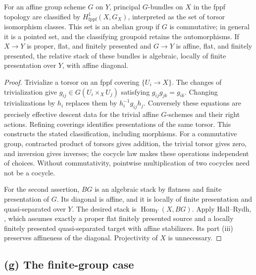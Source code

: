 \begin{theorem}
\label{geo-Kf}
For an affine group scheme $G$ on $Y$, principal $G$-bundles on $X$ in the
fppf topology are classified by $H^1_{\mathrm{fppf}}(X,G_X)$, interpreted
as the set of torsor isomorphism classes. This set is an abelian group if
$G$ is commutative; in general it is a pointed set, and the classifying
groupoid retains the automorphisms.
If $X\to Y$ is proper, flat, and finitely presented and $G\to Y$ is
affine, flat, and finitely presented, the relative stack of these bundles
is algebraic, locally of finite presentation over $Y$, with affine diagonal.
\end{theorem}
\begin{proof}
Trivialize a torsor on an fppf covering $\{U_i\to X\}$. The changes of
trivialization give $g_{ij}\in G(U_i\times_XU_j)$ satisfying
$g_{ij}g_{jk}=g_{ik}$. Changing trivializations by $h_i$ replaces them by
$h_i^{-1}g_{ij}h_j$. Conversely these equations are precisely effective
descent data for the trivial affine $G$-schemes and their right actions.
Refining coverings identifies presentations of the same torsor. This
constructs the stated classification, including morphisms. For a
commutative group, contracted product of torsors gives addition, the
trivial torsor gives zero, and inversion gives inverses; the cocycle law
makes these operations independent of choices. Without commutativity,
pointwise multiplication of two cocycles need not be a cocycle.

For the second assertion, $BG$ is an algebraic stack by flatness and finite
presentation of $G$. Its diagonal is affine, and it is locally of finite
presentation and quasi-separated over $Y$. The desired stack is
$\operatorname{Hom}_Y(X,BG)$. Apply Hall--Rydh,
\cite[Theorem 1.2, p.~1634]{HallRydh2019}, which assumes exactly a proper
flat finitely presented source and a locally finitely presented
quasi-separated target with affine stabilizers. Its part (iii) preserves
affineness of the diagonal. Projectivity of $X$ is unnecessary.
\end{proof}

\subsection{(g) The finite-group case}

